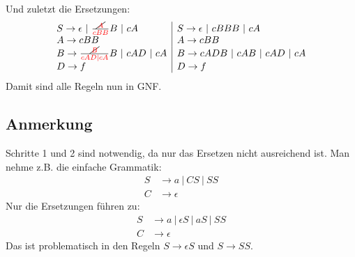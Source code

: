 \documentclass{article}
\begin{document}
Und zuletzt die Ersetzungen:
\begin{align*}
\begin{array}{l|l}
S \rightarrow \epsilon \ |\ \frac{\text{\cancel{\color{red}$A$}}}{\color{red}cBB}B \ |\ cA & S \rightarrow \epsilon \ |\ cBBB \ |\ cA  \\
A \rightarrow cBB                                                                          & A \rightarrow cBB                         \\
B \rightarrow \frac{\text{\cancel{\color{red}$B$}}}{\color{red}cAD|cA}B\ |\ cAD\ |\ cA     & B \rightarrow cADB\ |\ cAB\ |\ cAD\ |\ cA \\
D \rightarrow f                                                                            & D \rightarrow f
\end{array}
\end{align*}
Damit sind alle Regeln nun in GNF.

\subsection*{Anmerkung}
Schritte 1 und 2 sind notwendig, da nur das Ersetzen nicht ausreichend ist. Man nehme z.B. die einfache Grammatik:
\begin{align*}
S &\rightarrow a\ |\ CS\ |\ SS \\
C &\rightarrow \epsilon
\end{align*}
Nur die Ersetzungen führen zu:
\begin{align*}
S &\rightarrow a\ |\ \epsilon S\ |\ aS\ |\ SS \\
C &\rightarrow \epsilon
\end{align*}
Das ist problematisch in den Regeln $S \rightarrow \epsilon S$ und $S \rightarrow SS$.
\end{document}
